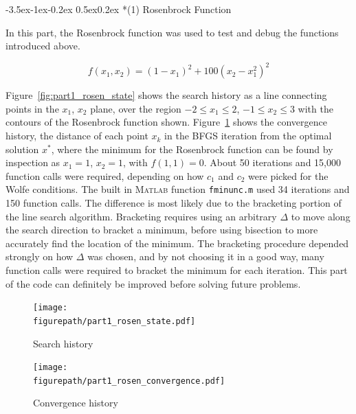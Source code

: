 \documentclass[11pt,letterpaper,onecolumn,notitlepage]{article}
\makeatletter
\newcommand{\figurepath}{../fig/hw1}
\renewcommand\subsection{\@startsection{subsection}{1}{\z@}%
{-3.5ex\@plus-1ex\@minus-0.2ex}%
{0.5ex\@plus0.2ex}%
{\fontsize{10pt}{10pt}\selectfont\bfseries\sffamily}}
\makeatother
\begin{document}
\subsection*{(1) Rosenbrock Function}

In this part, the Rosenbrock function was used to test and debug the functions introduced above.

\begin{equation*}
  f(x_{1},x_{2})=(1-x_{1})^{2}+100(x_{2}-x_{1}^{2})^{2}
\end{equation*}

Figure~\ref{fig:part1_rosen_state} shows the search history as a line connecting points in the $x_{1}$, $x_{2}$ plane, over the region $-2\leq x_{1}\leq2$, $-1\leq x_{2}\leq 3$ with the contours of the Rosenbrock function shown.
Figure~\ref{fig:part1_rosen_convergence} shows the convergence history, the distance of each point $x_{k}$ in the BFGS iteration from the optimal solution $x^{*}$, where the minimum for the Rosenbrock function can be found by inspection as $x_{1}=1$, $x_{2}=1$, with $f(1,1)=0$.
About 50 iterations and 15,000 function calls were required, depending on how $c_{1}$ and $c_{2}$ were picked for the Wolfe conditions.
The built in \textsc{Matlab} function \texttt{fminunc.m} used 34 iterations and 150 function calls.
The difference is most likely due to the bracketing portion of the line search algorithm.
Bracketing requires using an arbitrary $\Delta$ to move along the search direction to bracket a minimum, before using bisection to more accurately find the location of the minimum.
The bracketing procedure depended strongly on how $\Delta$ was chosen, and by not choosing it in a good way, many function calls were required to bracket the minimum for each iteration.
This part of the code can definitely be improved before solving future problems.

\begin{figure}[H]
  \centering
  \begin{minipage}{.48\textwidth}
    \centering
    \texttt{[image: \\figurepath/part1\_rosen\_state.pdf]}
    \caption{Search history\label{fig:part1_rosen_state}}
  \end{minipage}
  \hfill
  \begin{minipage}{.48\textwidth}
    \centering
    \texttt{[image: \\figurepath/part1\_rosen\_convergence.pdf]}
    \caption{Convergence history\label{fig:part1_rosen_convergence}}
  \end{minipage}
\end{figure}
\end{document}
